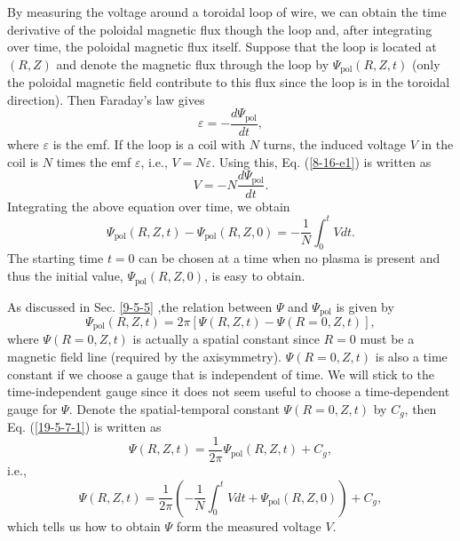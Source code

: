 \documentclass{llncs}
\newcommand{\tmop}[1]{\ensuremath{\operatorname{#1}}}
\begin{document}
By measuring the voltage around a toroidal loop of wire, we can obtain the
time derivative of the poloidal magnetic flux though the loop and, after
integrating over time, the poloidal magnetic flux itself. Suppose that the
loop is located at $(R, Z)$ and denote the magnetic flux through the loop by
$\Psi_{\tmop{pol}} (R, Z, t)$ (only the poloidal magnetic field contribute to
this flux since the loop is in the toroidal direction). Then Faraday's law
gives
\begin{equation}
  \label{8-16-e1} \varepsilon = - \frac{d \Psi_{\tmop{pol}}}{d t},
\end{equation}
where $\varepsilon$ is the emf. If the loop is a coil with $N$ turns, the
induced voltage $V$ in the coil is $N$ times the emf $\varepsilon$, i.e., $V =
N \varepsilon$. Using this, Eq. (\ref{8-16-e1}) is written as
\begin{equation}
  \label{8-16-e2} V = - N \frac{d \Psi_{\tmop{pol}}}{d t} .
\end{equation}
Integrating the above equation over time, we obtain
\begin{equation}
  \Psi_{\tmop{pol}} (R, Z, t) - \Psi_{\tmop{pol}} (R, Z, 0) = - \frac{1}{N}
  \int_0^t V dt.
\end{equation}
The starting time $t = 0$ can be chosen at a time when no plasma is present
and thus the initial value, $\Psi_{\tmop{pol}} (R, Z, 0)$, is easy to obtain.

As discussed in Sec. \ref{9-5-5} ,the relation between $\Psi$ and
$\Psi_{\tmop{pol}}$ is given by
\begin{equation}
  \label{19-5-7-1} \Psi_{\tmop{pol}} (R, Z, t) = 2 \pi [\Psi (R, Z, t) - \Psi
  (R = 0, Z, t)],
\end{equation}
where $\Psi (R = 0, Z, t)$ is actually a spatial constant since $R = 0$ must
be a magnetic field line (required by the axisymmetry). $\Psi (R = 0, Z, t)$
is also a time constant if we choose a gauge that is independent of time. We
will stick to the time-independent gauge since it does not seem useful to
choose a time-dependent gauge for $\Psi$. Denote the spatial-temporal constant
$\Psi (R = 0, Z, t)$ by $C_g$, then Eq. (\ref{19-5-7-1}) is written as
\begin{equation}
  \Psi (R, Z, t) = \frac{1}{2 \pi} \Psi_{\tmop{pol}} (R, Z, t) + C_g,
\end{equation}
i.e.,
\begin{equation}
  \Psi (R, Z, t) = \frac{1}{2 \pi} \left( - \frac{1}{N} \int_0^t V dt +
  \Psi_{\tmop{pol}} (R, Z, 0) \right) + C_g,
\end{equation}
which tells us how to obtain $\Psi$ form the measured voltage $V$.
\end{document}
